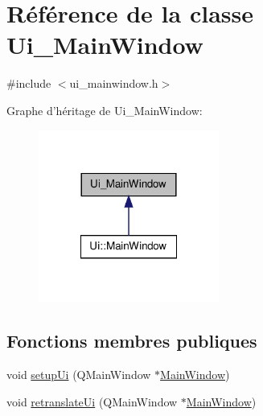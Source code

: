 \hypertarget{class_ui___main_window}{\section{Référence de la classe Ui\-\_\-\-Main\-Window}
\label{class_ui___main_window}
}


{\ttfamily \#include $<$ui\-\_\-mainwindow.\-h$>$}



Graphe d'héritage de Ui\-\_\-\-Main\-Window\-:\nopagebreak
\begin{figure}[H]
\begin{center}
\leavevmode
\includegraphics[width=168pt]{class_ui___main_window__inherit__graph}
\end{center}
\end{figure}
\subsection*{Fonctions membres publiques}
\begin{DoxyCompactItemize}
\item 
void \hyperlink{class_ui___main_window_acf4a0872c4c77d8f43a2ec66ed849b58}{setup\-Ui} (Q\-Main\-Window $\ast$\hyperlink{class_main_window}{Main\-Window})
\item 
void \hyperlink{class_ui___main_window_a097dd160c3534a204904cb374412c618}{retranslate\-Ui} (Q\-Main\-Window $\ast$\hyperlink{class_main_window}{Main\-Window})
\end{DoxyCompactItemize}
